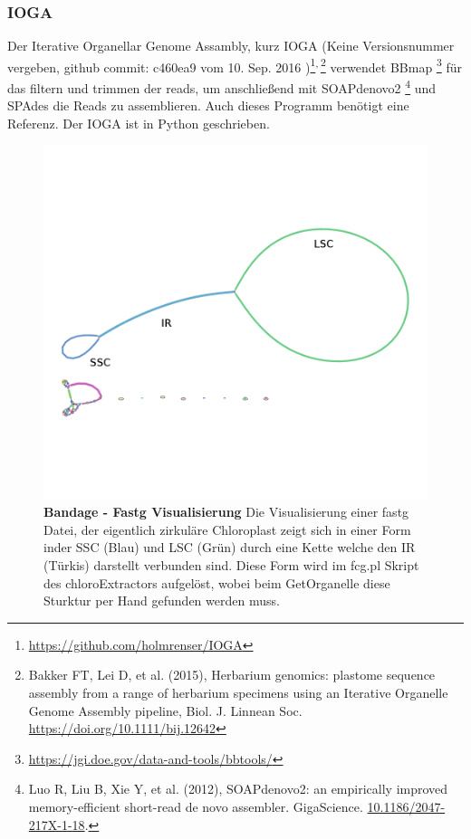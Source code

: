 \documentclass{scrartcl}
\begin{document}
\subsubsection{IOGA}
\label{sec-2-5-6}
Der Iterative Organellar Genome Assambly, kurz IOGA (Keine Versionsnummer vergeben, github commit: c460ea9 vom 10. Sep. 2016 )\footnote{\url{https://github.com/holmrenser/IOGA}}\textsuperscript{,}\,\footnote{Bakker FT, Lei D, et al. (2015), Herbarium genomics: plastome sequence assembly from a range of herbarium specimens using an Iterative Organelle Genome Assembly pipeline, Biol. J. Linnean Soc. \url{https://doi.org/10.1111/bij.12642}} verwendet BBmap \footnote{\url{https://jgi.doe.gov/data-and-tools/bbtools/}} für das filtern und trimmen der reads, um anschließend mit 
SOAPdenovo2 \footnote{Luo R, Liu B, Xie Y, et al. (2012), SOAPdenovo2: an empirically improved memory-efficient short-read de novo assembler. GigaScience.  \url{10.1186/2047-217X-1-18}.} und SPAdes \footnotemark[19]{} die Reads zu assemblieren. 
Auch dieses Programm benötigt eine Referenz. Der IOGA ist in Python geschrieben.
\begin{figure}
\includegraphics[width=.9\linewidth]{./graphCE_SRR1945473_1.png}
\caption[Bandage - Fastg Visualisierung]{\textbf{Bandage - Fastg Visualisierung} Die Visualisierung einer fastg Datei, der eigentlich zirkuläre Chloroplast zeigt sich in einer Form inder SSC (Blau) und LSC (Grün) durch eine Kette welche den IR (Türkis) darstellt verbunden sind. Diese Form wird im fcg.pl Skript des chloroExtractors aufgelöst, wobei beim GetOrganelle diese Sturktur per Hand gefunden werden muss.}
\end{figure}
\end{document}

